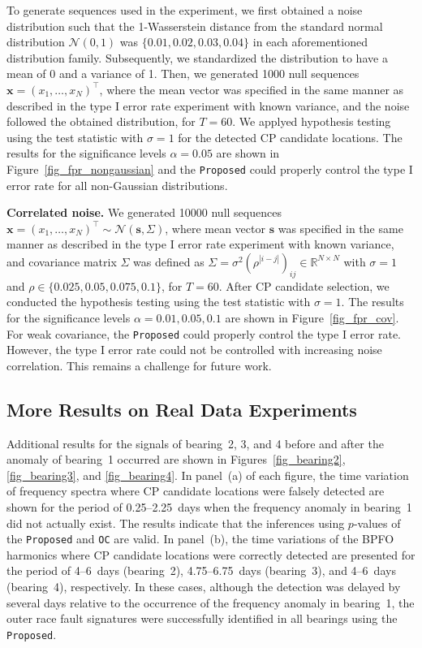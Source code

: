 To generate sequences used in the experiment, 
we first obtained a noise distribution such that the 1-Wasserstein distance from the standard normal distribution $\mathcal{N}(0,1)$ was $\{0.01,0.02,0.03,0.04\}$ in each aforementioned distribution family. 
Subsequently, we standardized the distribution to have a mean of 0 and a variance of 1.
Then, we generated 1000 null sequences $\bm{x}=(x_1, \dots, x_N)^\top$, 
where the mean vector was specified in the same manner as described in the type I error rate experiment with known variance, 
and the noise followed the obtained distribution, for $T=60$. 
We applyed hypothesis testing using the test statistic with $\sigma=1$ for the detected CP candidate locations.
The results for the significance levels $\alpha = 0.05$ are shown in Figure~\ref{fig_fpr_nongaussian} 
and the \texttt{Proposed} could properly control the type I error rate for all non-Gaussian distributions.

\textbf{Correlated noise.}
We generated 10000 null sequences 
$\bm{x}=(x_1, \dots, x_N)^\top \sim \mathcal{N}(\bm{s}, \Sigma)$, 
where mean vector $\bm{s}$ was specified in the same manner as described in the type I error rate experiment with known variance, 
and covariance matrix $\Sigma$ was defined as $\Sigma = \sigma^2\left(\rho^{|i-j|}\right)_{ij} \in \mathbb{R}^{N \times N}$ with $\sigma=1$ and $\rho \in \{0.025, 0.05, 0.075, 0.1\}$, for $T=60$.
After CP candidate selection, we conducted the hypothesis testing using the test statistic with $\sigma=1$. 
The results for the significance levels $\alpha = 0.01, 0.05, 0.1$ are shown in Figure~\ref{fig_fpr_cov}.
For weak covariance, the \texttt{Proposed} could properly control the type I error rate. 
However, the type I error rate could not be controlled with increasing noise correlation. %
This remains a challenge for future work. 

\subsection{More Results on Real Data Experiments}
\label{More_Results_on_Real_Data_Experiment}
Additional results for the signals of bearing~2, 3, and 4 
before and after the anomaly of bearing~1 occurred
are shown in Figures~\ref{fig_bearing2}, \ref{fig_bearing3}, and \ref{fig_bearing4}. 
In panel~(a) of each figure, the time variation of frequency spectra where CP candidate locations were falsely detected are shown for the period of 0.25--2.25~days when the frequency anomaly in bearing~1 did not actually exist. 
The results indicate that the inferences using $p$-values of the \texttt{Proposed} and \texttt{OC} are valid.
In panel~(b), the time variations of the BPFO harmonics where CP candidate locations were correctly detected are presented for the period of 4--6~days (bearing~2), 4.75--6.75~days (bearing~3), and 4--6~days (bearing~4), respectively.
In these cases, although the detection was delayed by several days relative to the occurrence of the frequency anomaly in bearing~1, 
the outer race fault signatures were successfully identified in all bearings using the \texttt{Proposed}.

